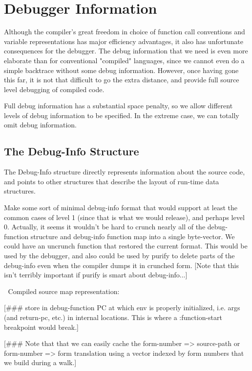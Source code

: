 
\chapter{Debugger Information}
\label{debug-info}

Although the compiler's great freedom in choice of function call conventions
and variable representations has major efficiency advantages, it also has
unfortunate consequences for the debugger.  The debug information that we need
is even more elaborate than for conventional "compiled" languages, since we
cannot even do a simple backtrace without some debug information.  However,
once having gone this far, it is not that difficult to go the extra distance,
and provide full source level debugging of compiled code.

Full debug information has a substantial space penalty, so we allow different
levels of debug information to be specified.  In the extreme case, we can
totally omit debug information.


\section{The Debug-Info Structure}

The Debug-Info structure directly represents information about the
source code, and points to other structures that describe the layout of
run-time data structures.


Make some sort of minimal debug-info format that would support at least the
common cases of level 1 (since that is what we would release), and perhaps
level 0.  Actually, it seems it wouldn't be hard to crunch nearly all of the
debug-function structure and debug-info function map into a single byte-vector.
We could have an uncrunch function that restored the current format.  This
would be used by the debugger, and also could be used by purify to delete parts
of the debug-info even when the compiler dumps it in crunched form.
[Note that this isn't terribly important if purify is smart about
debug-info...]



Compiled source map representation:

[\#\#\# store in debug-function PC at which env is properly initialized, i.e.
args (and return-pc, etc.) in internal locations.  This is where a
:function-start breakpoint would break.]

[\#\#\# Note that that we can easily cache the form-number => source-path or
form-number => form translation using a vector indexed by form numbers that we
build during a walk.]




